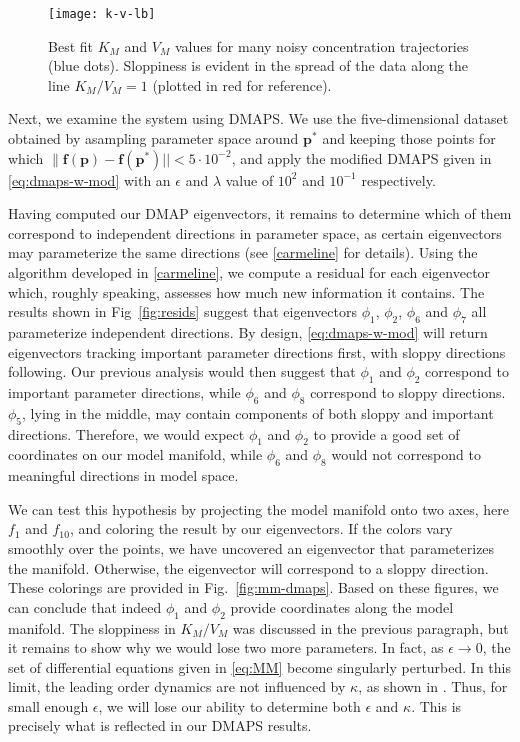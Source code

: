 \begin{figure}
  \centering
  \texttt{[image: k-v-lb]}
  \caption{Best fit $K_M$ and $V_M$ values for many noisy
    concentration trajectories (blue dots). Sloppiness is evident in
    the spread of the data along the line $K_M/V_M = 1$ (plotted in
    red for reference). \label{fig:lb} }
\end{figure}

Next, we examine the system using DMAPS. We use the five-dimensional
dataset obtained by asampling parameter space around $\mathbf{p}^*$
and keeping those points for which
$\|\mathbf{f(p) - f(p^*)} || < 5 \cdot 10^{-2}$, and apply the
modified DMAPS given in \eqref{eq:dmaps-w-mod} with an $\epsilon$ and
$\lambda$ value of $10^{2}$ and $10^{-1}$ respectively.

Having computed our DMAP eigenvectors, it remains to determine which
of them correspond to independent directions in parameter space, as
certain eigenvectors may parameterize the same directions (see
\ref{carmeline} for details). Using the algorithm developed in
\ref{carmeline}, we compute a residual for each eigenvector which,
roughly speaking, assesses how much new information it contains. The
results shown in Fig~\ref{fig:resids} suggest that eigenvectors
$\phi_1$, $\phi_2$, $\phi_6$ and $\phi_7$ all parameterize independent
directions. By design, \eqref{eq:dmaps-w-mod} will return eigenvectors
tracking important parameter directions first, with sloppy directions
following. Our previous analysis would then suggest that $\phi_1$ and
$\phi_2$ correspond to important parameter directions, while $\phi_6$
and $\phi_8$ correspond to sloppy directions. $\phi_5$, lying in the
middle, may contain components of both sloppy and important
directions. Therefore, we would expect $\phi_1$ and $\phi_2$ to
provide a good set of coordinates on our model manifold, while
$\phi_6$ and $\phi_8$ would not correspond to meaningful directions in
model space.

We can test this hypothesis by projecting the model manifold onto two
axes, here $f_1$ and $f_{10}$, and coloring the result by our
eigenvectors. If the colors vary smoothly over the points, we have
uncovered an eigenvector that parameterizes the manifold. Otherwise,
the eigenvector will correspond to a sloppy direction. These colorings
are provided in Fig.~\ref{fig:mm-dmaps}. Based on these figures, we
can conclude that indeed $\phi_1$ and $\phi_2$ provide coordinates
along the model manifold. The sloppiness in $K_M/V_M$ was discussed in
the previous paragraph, but it remains to show why we would lose two
more parameters. In fact, as $\epsilon \rightarrow 0$, the set of
differential equations given in \eqref{eq:MM} become singularly
perturbed. In this limit, the leading order dynamics are not
influenced by $\kappa$, as shown in \cite{segel_quasi-steady-state_1989}. Thus,
for small enough $\epsilon$, we will lose our ability to determine
both $\epsilon$ and $\kappa$. This is precisely what is reflected in
our DMAPS results.

